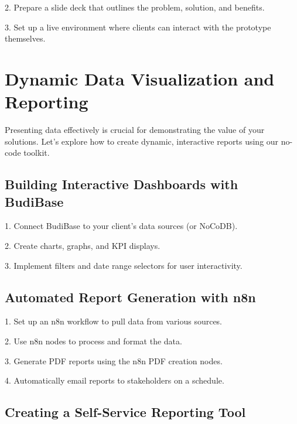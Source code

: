 2. Prepare a slide deck that outlines the problem, solution, and benefits.

3. Set up a live environment where clients can interact with the prototype themselves.


\section{Dynamic Data Visualization and Reporting}

Presenting data effectively is crucial for demonstrating the value of your solutions. Let's explore how to create dynamic, interactive reports using our no-code toolkit.

\subsection{Building Interactive Dashboards with BudiBase}

1. Connect BudiBase to your client's data sources (or NoCoDB).

2. Create charts, graphs, and KPI displays.


3. Implement filters and date range selectors for user interactivity.


\subsection{Automated Report Generation with n8n}

1. Set up an n8n workflow to pull data from various sources.

2. Use n8n nodes to process and format the data.

3. Generate PDF reports using the n8n PDF creation nodes.

4. Automatically email reports to stakeholders on a schedule.


\subsection{Creating a Self-Service Reporting Tool}

